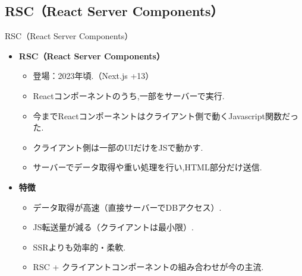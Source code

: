 \documentclass[aspectratio=169]{beamer}
\begin{document}
\subsection{RSC（React Server Components）}
\begin{frame}{RSC（React Server Components）}
    \begin{itemize}
        \setlength{\parskip}{1em}
        \item\textbf{RSC（React Server Components）}
        \begin{itemize}
            \setlength{\parskip}{1em}
            \item 登場：2023年頃.（Next.js +13）
            \item Reactコンポーネントのうち,一部をサーバーで実行.
            \item \rightarrow 今までReactコンポーネントはクライアント側で動くJavascript関数だった.
            \item クライアント側は一部のUIだけをJSで動かす.
            \item サーバーでデータ取得や重い処理を行い,HTML部分だけ送信.
        \end{itemize}
        \item\textbf{特徴}
        \begin{itemize}
            \setlength{\parskip}{1em}
            \item データ取得が高速（直接サーバーでDBアクセス）.
            \item JS転送量が減る（クライアントは最小限）.
            \item SSRよりも効率的・柔軟.
            \item RSC + クライアントコンポーネントの組み合わせが今の主流.
        \end{itemize}
    \end{itemize}
\end{frame}
\end{document}
